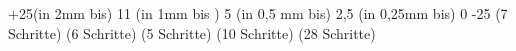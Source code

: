 +25(in 2mm bis) 11     (in 1mm bis ) 5     (in 0,5 mm bis) 2,5     (in 0,25mm bis) 0      -25
            (7 Schritte)        (6 Schritte)        (5 Schritte)            (10 Schritte)
                                            (28 Schritte)